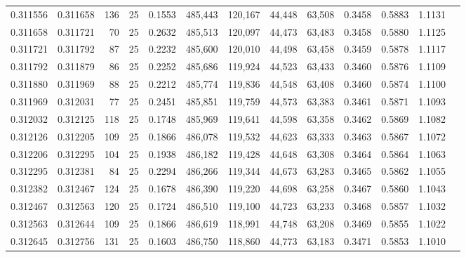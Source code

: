 \begin{tabular}{rrrrrrrrrrrrr}
0.311556 & 0.311658 &   136 &  25 &                                     0.1553 & 485,443 & 120,167 &  44,448 &  63,508 & 0.3458 & 0.5883 & 1.1131 \\
0.311658 & 0.311721 &    70 &  25 &                                     0.2632 & 485,513 & 120,097 &  44,473 &  63,483 & 0.3458 & 0.5880 & 1.1125 \\
0.311721 & 0.311792 &    87 &  25 &                                     0.2232 & 485,600 & 120,010 &  44,498 &  63,458 & 0.3459 & 0.5878 & 1.1117 \\
0.311792 & 0.311879 &    86 &  25 &                                     0.2252 & 485,686 & 119,924 &  44,523 &  63,433 & 0.3460 & 0.5876 & 1.1109 \\
0.311880 & 0.311969 &    88 &  25 &                                     0.2212 & 485,774 & 119,836 &  44,548 &  63,408 & 0.3460 & 0.5874 & 1.1100 \\
0.311969 & 0.312031 &    77 &  25 &                                     0.2451 & 485,851 & 119,759 &  44,573 &  63,383 & 0.3461 & 0.5871 & 1.1093 \\
0.312032 & 0.312125 &   118 &  25 &                                     0.1748 & 485,969 & 119,641 &  44,598 &  63,358 & 0.3462 & 0.5869 & 1.1082 \\
0.312126 & 0.312205 &   109 &  25 &                                     0.1866 & 486,078 & 119,532 &  44,623 &  63,333 & 0.3463 & 0.5867 & 1.1072 \\
0.312206 & 0.312295 &   104 &  25 &                                     0.1938 & 486,182 & 119,428 &  44,648 &  63,308 & 0.3464 & 0.5864 & 1.1063 \\
0.312295 & 0.312381 &    84 &  25 &                                     0.2294 & 486,266 & 119,344 &  44,673 &  63,283 & 0.3465 & 0.5862 & 1.1055 \\
0.312382 & 0.312467 &   124 &  25 &                                     0.1678 & 486,390 & 119,220 &  44,698 &  63,258 & 0.3467 & 0.5860 & 1.1043 \\
0.312467 & 0.312563 &   120 &  25 &                                     0.1724 & 486,510 & 119,100 &  44,723 &  63,233 & 0.3468 & 0.5857 & 1.1032 \\
0.312563 & 0.312644 &   109 &  25 &                                     0.1866 & 486,619 & 118,991 &  44,748 &  63,208 & 0.3469 & 0.5855 & 1.1022 \\
0.312645 & 0.312756 &   131 &  25 &                                     0.1603 & 486,750 & 118,860 &  44,773 &  63,183 & 0.3471 & 0.5853 & 1.1010 \\

\end{tabular}
